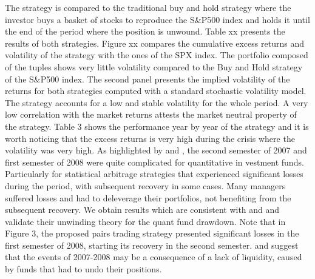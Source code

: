 \documentclass[11pt,a4,twosided,singlespacing,titlepagenumber=on]{scrreprt}
\numberwithin{equation}{chapter} %
\theoremstyle{remark}
\begin{document}
The strategy is compared to the traditional buy and hold strategy where the investor buys a basket of stocks to reproduce the S\&P500 index and holds it until the end of the period where the position is unwound. Table xx presents the results of both strategies. Figure xx compares the cumulative excess returns and volatility of the strategy with the ones of the SPX index. The portfolio composed of the tuples shows very little volatility compared to the Buy and Hold strategy of the S\&P500 index. The second panel presents the implied volatility of the returns for both strategies computed with a standard stochastic volatility model. The strategy accounts for a low and stable volatility for the whole period. A very low correlation with the market returns attests the market neutral property of the strategy. Table 3 shows the performance year by year of the strategy and it is worth noticing that the excess returns is very high during the crisis where the volatility was very high. As highlighted by \cite{khandani2007} and \cite{avellaneda2010}, the second semester of 2007 and first semester of 2008 were quite complicated for quantitative in vestment funds. Particularly for statistical arbitrage strategies that experienced significant losses during the period, with subsequent recovery in some cases. Many managers suffered losses and had to deleverage their portfolios, not benefiting from the subsequent recovery. We obtain results which are consistent with \cite{khandani2007} and \cite{avellaneda2010} and validate their unwinding theory for the quant fund drawdown. Note that in Figure 3, the proposed pairs trading strategy presented significant losses in the first semester of 2008, starting its recovery in the second semester. \cite{khandani2007} and \cite{avellaneda2010} suggest that the events of 2007-2008 may be a consequence of a lack of liquidity, caused by funds that had to undo their positions.
\end{document}
